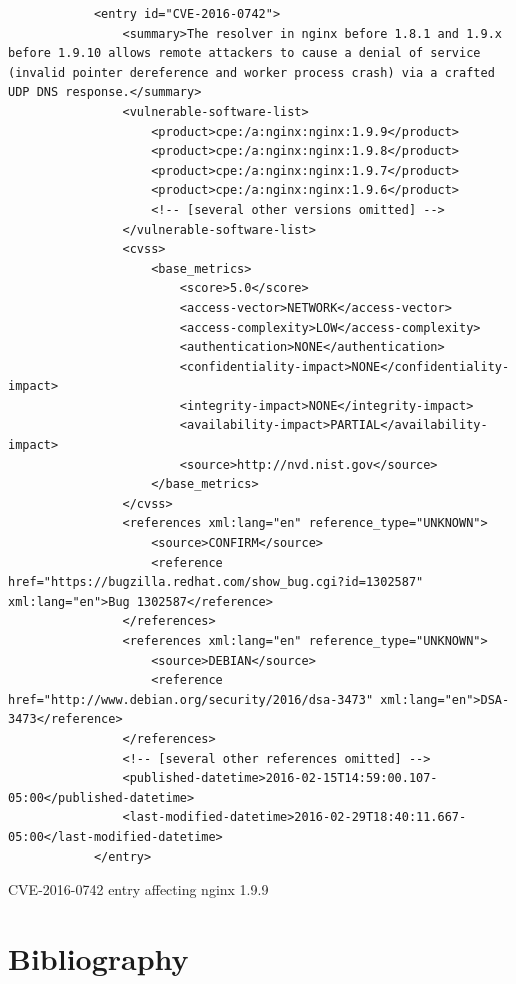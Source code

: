 \documentclass[a4paper,12pt]{article}
\begin{document}
	\begin{listing}[H]
		\begin{verbatim}
			<entry id="CVE-2016-0742">
				<summary>The resolver in nginx before 1.8.1 and 1.9.x before 1.9.10 allows remote attackers to cause a denial of service (invalid pointer dereference and worker process crash) via a crafted UDP DNS response.</summary>
				<vulnerable-software-list>
					<product>cpe:/a:nginx:nginx:1.9.9</product>
					<product>cpe:/a:nginx:nginx:1.9.8</product>
					<product>cpe:/a:nginx:nginx:1.9.7</product>
					<product>cpe:/a:nginx:nginx:1.9.6</product>
					<!-- [several other versions omitted] -->
				</vulnerable-software-list>
				<cvss>
					<base_metrics>
						<score>5.0</score>
						<access-vector>NETWORK</access-vector>
						<access-complexity>LOW</access-complexity>
						<authentication>NONE</authentication>
						<confidentiality-impact>NONE</confidentiality-impact>
						<integrity-impact>NONE</integrity-impact>
						<availability-impact>PARTIAL</availability-impact>
						<source>http://nvd.nist.gov</source>
					</base_metrics>
				</cvss>
				<references xml:lang="en" reference_type="UNKNOWN">
					<source>CONFIRM</source>
					<reference href="https://bugzilla.redhat.com/show_bug.cgi?id=1302587" xml:lang="en">Bug 1302587</reference>
				</references>
				<references xml:lang="en" reference_type="UNKNOWN">
					<source>DEBIAN</source>
					<reference href="http://www.debian.org/security/2016/dsa-3473" xml:lang="en">DSA-3473</reference>
				</references>
				<!-- [several other references omitted] -->
				<published-datetime>2016-02-15T14:59:00.107-05:00</published-datetime>
				<last-modified-datetime>2016-02-29T18:40:11.667-05:00</last-modified-datetime>
			</entry>
		\end{verbatim}
		\caption{CVE-2016-0742 entry affecting nginx 1.9.9}
		\label{nginxcve}
	\end{listing}

\newpage
\section{Bibliography}
 

	\begingroup
	\renewcommand{\section}[2]{}
	\renewcommand{\markboth}[2]{}
		
		
	\endgroup
\end{document}

